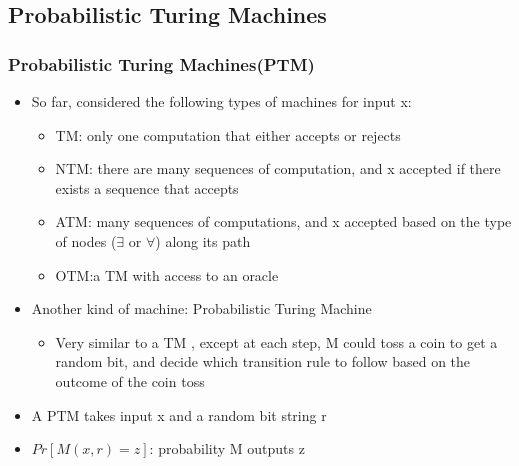 \documentclass{beamer}
\begin{document}
\subsection{Probabilistic Turing Machines}
\begin{frame}
\frametitle{Probabilistic Turing Machines(PTM)}
\begin{itemize}
	\item So far, considered the following types of machines for input x:
	\begin{itemize}
		\item {\color{red} TM}: only one computation that either accepts or rejects
		\item {\color{red} NTM}: there are many sequences of computation, and x accepted if there exists a sequence that accepts

		\item {\color{red} ATM}: many sequences of computations, and x accepted based on the type of nodes ($\exists$ or $\forall$) along its path
		\item {\color{red} OTM}:a TM with access to an oracle
	\end{itemize}
	\item Another kind of machine: {\color{red} Probabilistic Turing Machine}
	\begin{itemize}
		\item Very similar to a TM , except at each step, M could toss a coin to get a random bit, and decide which transition rule to follow based on the outcome of the coin toss
	\end{itemize}
	\item A PTM takes input x and a random bit string r
	\item $Pr[M(x,r) = z]$: probability M outputs z
\end{itemize}
\end{frame}
\end{document}
